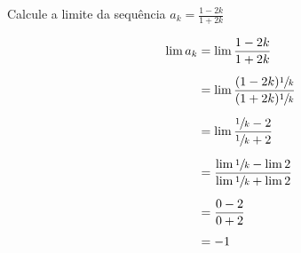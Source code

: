 \documentclass[a4paper,12pt,fleqn]{article}
\begin{document}
Calcule a limite da sequência \(a_k = \frac{1-2k}{1+2k}\)

\begin{answer}
  \begin{align*}
    \lim a_k
    & = \lim \frac{1-2k}{1+2k} \\[2mm]
    & = \lim \frac{(1-2k)\sfrac{1}{k}}{(1+2k)\sfrac{1}{k}} \\[2mm]
    & = \lim \frac{\sfrac{1}{k}-2}{\sfrac{1}{k}+2} \\[2mm]
    & = \frac{\lim \sfrac{1}{k}-\lim 2}{\lim \sfrac{1}{k}+\lim 2} \\[2mm]
    & = \frac{0-2}{0+2} \\[2mm]
    & = -1
  \end{align*}
  \clearpage
\end{answer}

\end{document}
